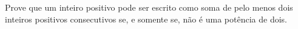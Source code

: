 Prove que um inteiro positivo pode ser escrito como soma de pelo menos dois inteiros positivos consecutivos se, e somente se, não é uma potência de dois.
